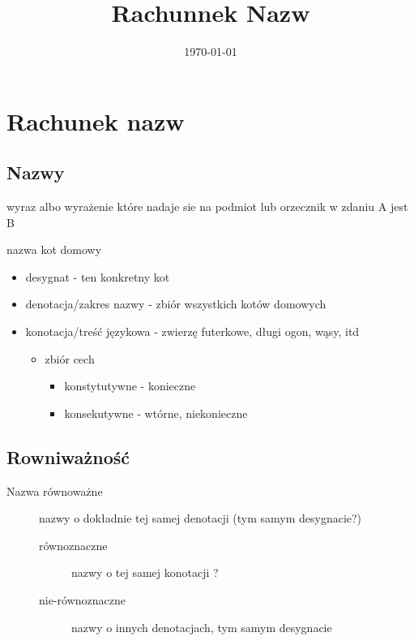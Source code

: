 \documentclass[11pt]{article}
\date{\today}
\title{Rachunnek Nazw}
\begin{document}
\maketitle
\tableofcontents



\section{Rachunek nazw}
\label{sec:orgef20363}


\subsection{Nazwy}
\label{sec:org261665b}

\begin{description}
\item[{Nazwa}] wyraz albo wyrażenie które nadaje sie na podmiot lub orzecznik w zdaniu A jest B

\item nazwa kot domowy 
\begin{itemize}
\item desygnat - ten konkretny kot
\item denotacja/zakres nazwy - zbiór wszystkich kotów domowych
\item konotacja/treść językowa - zwierzę futerkowe, długi ogon, wąsy, itd
\begin{itemize}
\item zbiór cech
\begin{itemize}
\item konstytutywne - konieczne
\item konsekutywne - wtórne, niekonieczne
\end{itemize}
\end{itemize}
\end{itemize}
\end{description}


\subsection{Rowniważność}
\label{sec:orgd9173e9}

\begin{description}
\item[{Nazwa równoważne}] nazwy o dokładnie tej samej denotacji (tym samym desygnacie?)
\begin{description}
\item[{równoznaczne}] nazwy o tej samej konotacji ?
\item[{nie-równoznaczne}] nazwy o innych denotacjach, tym samym desygnacie
\end{description}
\end{description}
\end{document}
